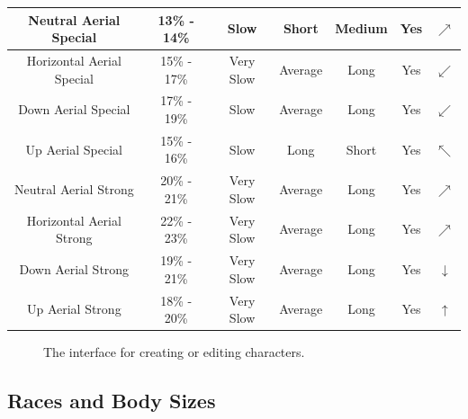 \begin{table}[h!]
\begin{tabular}{| c | c | c | c | c | c | c |}
        \hline
        Neutral Aerial Special & 13\% - 14\% & Slow & Short & Medium & Yes & $\nearrow$ \\
        \hline
        Horizontal Aerial Special & 15\% - 17\% & Very Slow & Average & Long & Yes & $\swarrow$ \\
        \hline
        Down Aerial Special & 17\% - 19\% & Slow & Average & Long & Yes & $\swarrow$ \\
        \hline
        Up Aerial Special & 15\% - 16\% & Slow & Long & Short & Yes & $\nwarrow$ \\
        \hline
        Neutral Aerial Strong & 20\% - 21\% & Very Slow & Average & Long & Yes & $\nearrow$ \\
        \hline
        Horizontal Aerial Strong & 22\% - 23\% & Very Slow & Average & Long & Yes & $\nearrow$ \\
        \hline
        Down Aerial Strong & 19\% - 21\% & Very Slow & Average & Long & Yes & $\downarrow$ \\
        \hline
        Up Aerial Strong & 18\% - 20\% & Very Slow & Average & Long & Yes & $\uparrow$ \\
        \hline
    \end{tabular}
\end{table}

\pagebreak

\begin{figure}[h!]
    \centering
    \caption{The interface for creating or editing characters.}
\end{figure}

\subsection{Races and Body Sizes}

